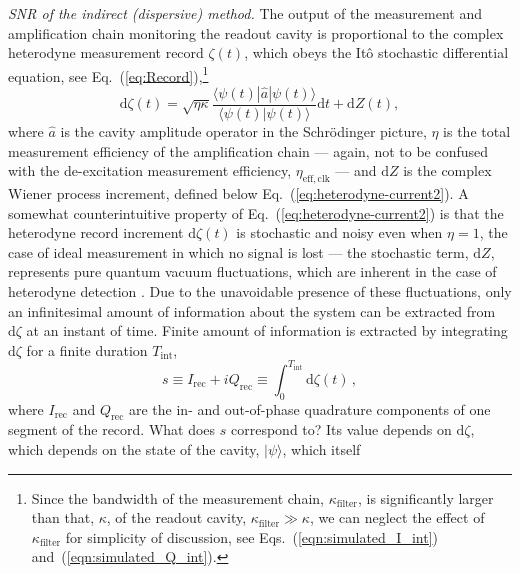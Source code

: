 \emph{SNR of the indirect (dispersive) method.}  The output of the
measurement and amplification chain monitoring the readout cavity
is proportional to the complex heterodyne measurement record $\zeta\left(t\right)$,
which obeys the It\^{o} stochastic differential equation, see Eq.~(\ref{eq:Record}),\footnote{Since the bandwidth of the measurement chain, $\kappa_{\mathrm{filter}}$,
is significantly larger than that, $\kappa$, of the readout cavity,
$\kappa_{\mathrm{filter}}\gg\kappa$, we can neglect the effect of
$\kappa_{\mathrm{filter}}$ for simplicity of discussion, see Eqs.~(\ref{eqn:simulated_I_int})
and~(\ref{eqn:simulated_Q_int}).} 
\begin{equation}
\mathrm{d}\zeta\left(t\right)=\sqrt{\eta\kappa}\frac{\langle\psi\left(t\right)|\hat{a}|\psi\left(t\right)\rangle}{\langle\psi\left(t\right)|\psi\left(t\right)\rangle}\mathrm{d}t+\mathrm{d}Z\left(t\right),\label{eq:heterodyne-current2}
\end{equation}
where $\hat{a}$ is the cavity amplitude operator in the Schr\"{o}dinger
picture, $\eta$ is the total measurement efficiency of the amplification
chain --- again, not to be confused with the de-excitation measurement
efficiency, $\eta_{\mathrm{eff,clk}}$ --- and $\mathrm{d}Z$ is
the complex Wiener process increment, defined below Eq.~(\ref{eq:heterodyne-current2}).
A somewhat counterintuitive property of Eq.~(\ref{eq:heterodyne-current2})
is that  the heterodyne record increment $\mathrm{d}\zeta\left(t\right)$
is stochastic and noisy even when $\eta=1$, the case of ideal measurement
in which no signal is lost --- the stochastic term, $\mathrm{d}Z$,
represents pure quantum vacuum fluctuations, which are inherent in
the case of heterodyne detection \citep{Carmichael1993,Plenio1998,wiseman2010book}.
Due to the unavoidable presence of these fluctuations, only an infinitesimal
amount of information about the system can be extracted from $\mathrm{d}\zeta$
at an instant of time. Finite amount of information is extracted by
integrating $\mathrm{d}\zeta$ for a finite duration $T_{\mathrm{int}}$,
\begin{equation}
s\equiv I_{\mathrm{rec}}+iQ_{\mathrm{rec}}\equiv\int_{0}^{T_{\mathrm{int}}}\mathrm{d}\zeta\left(t\right)\,,\label{eq:s=00003D}
\end{equation}
where $I_{\mathrm{rec}}$ and $Q_{\mathrm{rec}}$ are the in- and
out-of-phase quadrature components of one segment of the record. What
does $s$ correspond to? Its value depends on $\mathrm{d}\zeta$,
which depends on the state of the cavity, $|\psi\rangle$, which itself
